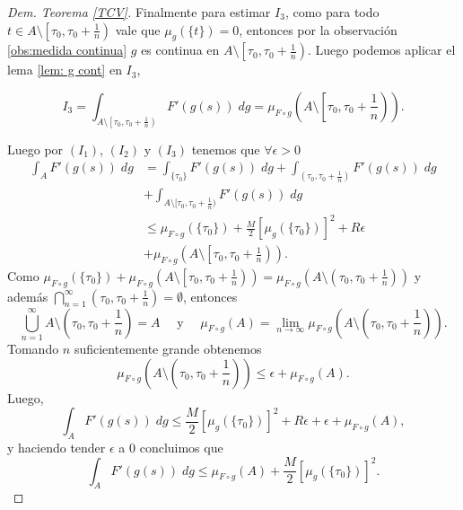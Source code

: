 \begin{proof}[Dem. Teorema \eqref{TCV}]
 Finalmente para estimar $I_3$, como para todo $t\in A\setminus\left[\tau_0,\tau_0+\frac{1}{n}\right)$ vale que $\mu_g(\{t\})=0$, entonces por la observación \ref{obs:medida continua}  $g$ es continua en $A\setminus\left[\tau_0,\tau_0+\frac{1}{n}\right)$. Luego podemos aplicar el lema \ref{lem: g cont} en $I_3$,


 
 \begin{equation*}
		I_3=\int_{A\setminus\left[\tau_0,\tau_0+\frac{1}{n}\right)}F'(g(s))\; dg=\mu_{F\circ g}\left( A\setminus\left[ \tau_0,\tau_0+\frac{1}{n}\right) \right). 
	\end{equation*}

Luego por $(I_1)$, $(I_2)$ y $(I_3)$ tenemos que $\forall\epsilon>0$ 
\begin{equation*}
\begin{split}
	\int_AF'(g(s))\; dg&=\int_{\{\tau_0\}}F'(g(s))\; dg+\int_{(\tau_0,\tau_0+\frac{1}{n})}F'(g(s))\; dg\\
    &+\int_{A\setminus[\tau_0,\tau_0+\frac{1}{n})}F'(g(s))\; dg\\
	&\leq 	\mu_{F\circ g}(\{\tau_0\})+\frac{M}{2}\left[ \mu_{g}(\{\tau_0\})\right]^2 +R\epsilon\\&+\mu_{F\circ g}\left( A\setminus\left[ \tau_0,\tau_0+\frac{1}{n}\right) \right).
\end{split}
\end{equation*}
Como $\mu_{F\circ g}(\{\tau_0\})+\mu_{F\circ g}\left( A\setminus\left[ \tau_0,\tau_0+\frac{1}{n}\right) \right)=\mu_{F\circ g}\left( A\setminus\left( \tau_0,\tau_0+\frac{1}{n}\right) \right)$ y además $\displaystyle\bigcap_{n=1}^{\infty}\left( \tau_0,\tau_0+\frac{1}{n}\right) =\emptyset$, entonces 
$$\bigcup_{n=1}^{\infty}A\setminus\left( \tau_0,\tau_0+\frac{1}{n}\right) =A \quad\text{ y  } \quad \mu_{F\circ g}(A)=\lim\limits_{n\to \infty}\mu_{F\circ g}\left( A\setminus\left( \tau_0,\tau_0+\frac{1}{n}\right)\right). $$
 Tomando $n$ suficientemente grande obtenemos  
 $$  \mu_{F\circ g}\left( A\setminus\left( \tau_0,\tau_0+\frac{1}{n}\right)\right)\leq \epsilon +\mu_{F\circ g}(A).$$
 Luego, 
 	\begin{equation*}
 	\int_{A} F'(g(s))\; dg
 	\leq \frac{M}{2}\left[ \mu_{g}(\{\tau_0\})\right]^2 +R\epsilon+\epsilon+\mu_{F\circ g}\left( A \right) ,
 \end{equation*}
 y haciendo tender $\epsilon$ a $0$ concluimos que
 \begin{equation}
 		\int_AF'(g(s))\; dg
 	\leq 	\mu_{F\circ g}(A)+\frac{M}{2}\left[ \mu_{g}(\{\tau_0\})\right]^2 .
 \end{equation}
 \label{caso particular}
	





\end{proof}
